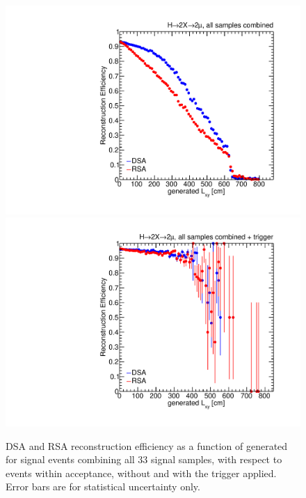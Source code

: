 \begin{figure}[p]
  \centering
  \includegraphics[width=\DSquareWidth]{figures/displaced/REFF_Lxy_2Mu2J_Global.pdf}
  \hspace*{-2em}
  \includegraphics[width=\DSquareWidth]{figures/displaced/REFF_Lxy_Trig_2Mu2J_Global.pdf}
  \caption[DSA and RSA reconstruction efficiency as a function of generated \Lxy]{DSA and RSA reconstruction efficiency as a function of generated \Lxy for \twoMu signal events combining all 33 signal samples, with respect to events within acceptance,  without and  with the trigger applied. Error bars are for statistical uncertainty only.}
  \label{fig:dd:REFF}
\end{figure}
